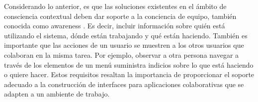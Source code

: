 Considerando lo anterior, es que las soluciones existentes en el ámbito de consciencia contextual deben dar soporte a la conciencia de equipo, también conocida como awareness \citep{Dourish1992a}. Es decir, incluir información sobre quién está utilizando el sistema, dónde están trabajando y qué están haciendo. También es importante que las acciones de un usuario se muestren a los otros usuarios que colaboran en la misma tarea. Por ejemplo, observar a otra persona navegar a través de los elementos de un menú suministra indicios sobre lo que está haciendo o quiere hacer. Estos requisitos resaltan la importancia de proporcionar el soporte adecuado a la construcción de interfaces para aplicaciones colaborativas que se adapten a un ambiente de trabajo.
